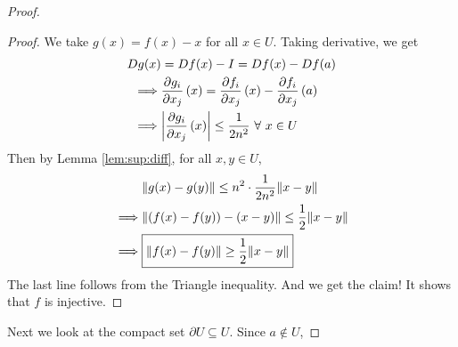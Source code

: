 \documentclass[../Analysis-3.tex]{subfiles}
\begin{document}
\begin{proof}
  \begin{proof}
    We take $ g(x) = f(x) - x $ for all $ x \in U $. Taking derivative, we get
    \begin{align*}
      Dg(x)    & = Df(x) - I  = Df(x) - Df(a)                                                                     \\
      \implies & \pdv{g_i}{x_j}\left( x \right) = \pdv{f_i}{x_j}\left( x \right) - \pdv{f_i}{x_j}\left( a \right) \\
      \implies & \abs{\pdv{g_i}{x_j}\left( x \right)} \leq \frac{1}{2n^2} \ \forall\ x \in U
    \end{align*}
    Then by Lemma \ref{lem:sup:diff}, for all $ x, y \in U $, \begin{align*}
               & \norm{g(x)-g(y)} \leq n^2\cdot\frac{1}{2n^2}\norm{x-y} \\
      \implies & \norm{(f(x)-f(y)) - (x-y)} \leq \frac{1}{2}\norm{x-y}  \\
      \implies & \boxed{\norm{f(x)-f(y)} \geq \frac{1}{2}\norm{x-y}}
    \end{align*}
    The last line follows from the Triangle inequality. And we get the claim! It shows that $ f $ is injective.
  \end{proof}
  Next we look at the compact set $ \partial U \subseteq U $. Since $ a \not\in U $,
\end{proof}
\end{document}
